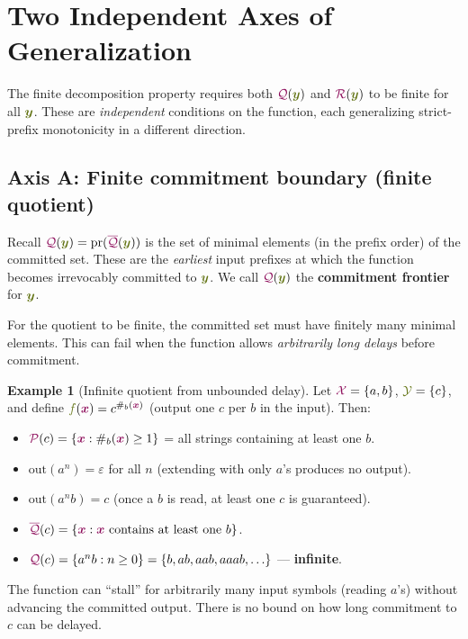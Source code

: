 \documentclass{article}
\newcommand{\defn}[1]{\textbf{#1}}
\newcommand{\preCover}{{\color{TokenColor}\mathcal{P}}}
\newcommand{\maxQuotient}{{\color{TokenColor}\overline{\mathcal{Q}}}}
\newcommand{\Quotient}{{\color{TokenColor}\mathcal{Q}}}
\newcommand{\Remainder}{{\color{TokenColor}\mathcal{R}}}
\newcommand{\transFnSym}[0]{f}
\newcommand{\transFn}{\ensuremath{{\color{CharacterColor}\transFnSym}}\xspace}
\newcommand{\srcStr}{\ensuremath{{\color{TokenColor}\boldsymbol{x}}}\xspace}
\newcommand{\tgtStr}{{\color{CharacterColor}\boldsymbol{y}}}
\newcommand{\srcAlphabet}[0]{{\color{TokenColor}\ensuremath{\mathcal{X}}}\xspace}
\newcommand{\tgtAlphabet}[0]{{\color{CharacterColor}\ensuremath{\mathcal{Y}}}\xspace}
\newcommand{\committed}{\mathrm{out}}
\theoremstyle{plain}
\theoremstyle{definition}
\newtheorem{example}[theorem]{Example}
\theoremstyle{remark}
\begin{document}
\section{Two Independent Axes of Generalization}
\label{sec:axes}

The finite decomposition property requires both $\Quotient(\tgtStr)$ and
$\Remainder(\tgtStr)$ to be finite for all $\tgtStr$.  These are
\emph{independent} conditions on the function, each generalizing strict-prefix
monotonicity in a different direction.

\subsection{Axis A: Finite commitment boundary (finite quotient)}

Recall $\Quotient(\tgtStr) = \mathrm{pr}(\maxQuotient(\tgtStr))$ is the set of
minimal elements (in the prefix order) of the committed set.  These are the
\emph{earliest} input prefixes at which the function becomes irrevocably
committed to $\tgtStr$.  We call $\Quotient(\tgtStr)$ the \defn{commitment
frontier} for $\tgtStr$.

For the quotient to be finite, the committed set must have finitely many
minimal elements.  This can fail when the function allows \emph{arbitrarily
long delays} before commitment.

\begin{example}[Infinite quotient from unbounded delay]
\label{ex:infinite-Q}
Let $\srcAlphabet = \{a, b\}$, $\tgtAlphabet = \{c\}$, and define
$\transFn(\srcStr) = c^{\#_b(\srcStr)}$ (output one $c$ per $b$ in the
input).  Then:
\begin{itemize}
\item $\preCover(c) = \{\srcStr : \#_b(\srcStr) \geq 1\}$ = all strings containing at least one $b$.
\item $\committed(a^n) = \varepsilon$ for all $n$ (extending with only $a$'s produces no output).
\item $\committed(a^n b) = c$ (once a $b$ is read, at least one $c$ is guaranteed).
\item $\maxQuotient(c) = \{\srcStr : \srcStr \text{ contains at least one } b\}$.
\item $\Quotient(c) = \{a^n b : n \geq 0\} = \{b, ab, aab, aaab, \ldots\}$ --- \textbf{infinite}.
\end{itemize}
The function can ``stall'' for arbitrarily many input symbols (reading $a$'s)
without advancing the committed output.  There is no bound on how long
commitment to $c$ can be delayed.
\end{example}
\end{document}
